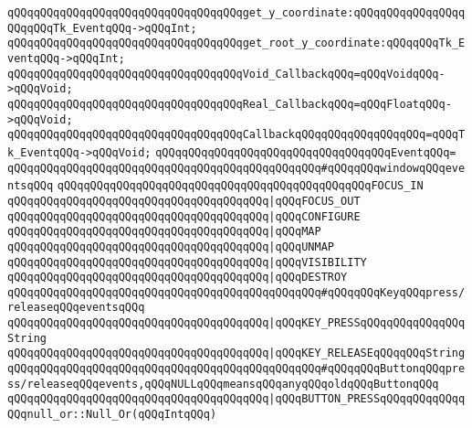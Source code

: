 \verb|qQQqqQQqqQQqqQQqqQQqqQQqqQQqqQQqqQQqget_y_coordinate:qQQqqQQqqQQqqQQqqQQqqQQqTk_EventqQQq->qQQqInt;|\newline
\verb|qQQqqQQqqQQqqQQqqQQqqQQqqQQqqQQqqQQqget_root_y_coordinate:qQQqqQQqTk_EventqQQq->qQQqInt;|\newline
\newline
\verb|qQQqqQQqqQQqqQQqqQQqqQQqqQQqqQQqqQQqVoid_CallbackqQQq=qQQqVoidqQQq->qQQqVoid;|\newline
\verb|qQQqqQQqqQQqqQQqqQQqqQQqqQQqqQQqqQQqReal_CallbackqQQq=qQQqFloatqQQq->qQQqVoid;|\newline
\verb|qQQqqQQqqQQqqQQqqQQqqQQqqQQqqQQqqQQqCallbackqQQqqQQqqQQqqQQqqQQq=qQQqTk_EventqQQq->qQQqVoid;|\newline
\newline
\verb|qQQqqQQqqQQqqQQqqQQqqQQqqQQqqQQqqQQqEventqQQq=|\newline
\verb|qQQqqQQqqQQqqQQqqQQqqQQqqQQqqQQqqQQqqQQqqQQqqQQq#qQQqqQQqwindowqQQqeventsqQQq|\newline
\verb|qQQqqQQqqQQqqQQqqQQqqQQqqQQqqQQqqQQqqQQqqQQqqQQqFOCUS_IN|\newline
\verb|qQQqqQQqqQQqqQQqqQQqqQQqqQQqqQQqqQQqqQQq|\verb#|qQQqFOCUS_OUT#\newline
\verb|qQQqqQQqqQQqqQQqqQQqqQQqqQQqqQQqqQQqqQQq|\verb#|qQQqCONFIGURE#\newline
\verb|qQQqqQQqqQQqqQQqqQQqqQQqqQQqqQQqqQQqqQQq|\verb#|qQQqMAP#\newline
\verb|qQQqqQQqqQQqqQQqqQQqqQQqqQQqqQQqqQQqqQQq|\verb#|qQQqUNMAP#\newline
\verb|qQQqqQQqqQQqqQQqqQQqqQQqqQQqqQQqqQQqqQQq|\verb#|qQQqVISIBILITY#\newline
\verb|qQQqqQQqqQQqqQQqqQQqqQQqqQQqqQQqqQQqqQQq|\verb#|qQQqDESTROY#\newline
\verb|qQQqqQQqqQQqqQQqqQQqqQQqqQQqqQQqqQQqqQQqqQQqqQQq#qQQqqQQqKeyqQQqpress/releaseqQQqeventsqQQq|\newline
\verb|qQQqqQQqqQQqqQQqqQQqqQQqqQQqqQQqqQQqqQQq|\verb#|qQQqKEY_PRESSqQQqqQQqqQQqqQQqString#\newline
\verb|qQQqqQQqqQQqqQQqqQQqqQQqqQQqqQQqqQQqqQQq|\verb#|qQQqKEY_RELEASEqQQqqQQqString#\newline
\verb|qQQqqQQqqQQqqQQqqQQqqQQqqQQqqQQqqQQqqQQqqQQqqQQq#qQQqqQQqButtonqQQqpress/releaseqQQqevents,qQQqNULLqQQqmeansqQQqanyqQQqoldqQQqButtonqQQq|\newline
\verb|qQQqqQQqqQQqqQQqqQQqqQQqqQQqqQQqqQQqqQQq|\verb#|qQQqBUTTON_PRESSqQQqqQQqqQQqqQQqnull_or::Null_Or(qQQqIntqQQq)#\newline
